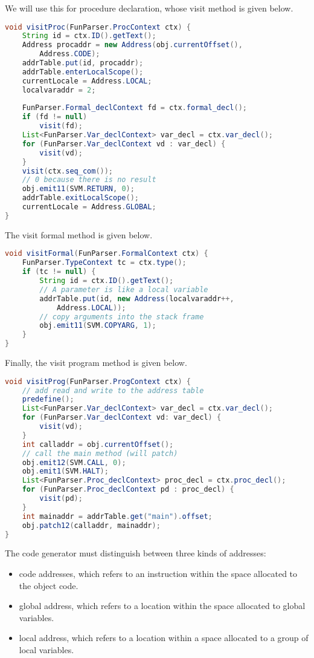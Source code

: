 \documentclass[a4paper, openany]{memoir}
\begin{document}

We will use this for procedure declaration, whose visit method is given below.
\begin{lstlisting}[language=java]
void visitProc(FunParser.ProcContext ctx) {
    String id = ctx.ID().getText();
    Address procaddr = new Address(obj.currentOffset(), 
        Address.CODE);
    addrTable.put(id, procaddr);
    addrTable.enterLocalScope();
    currentLocale = Address.LOCAL;
    localvaraddr = 2;
    
    FunParser.Formal_declContext fd = ctx.formal_decl();
    if (fd != null)
        visit(fd);
    List<FunParser.Var_declContext> var_decl = ctx.var_decl();
    for (FunParser.Var_declContext vd : var_decl) {
        visit(vd);
    }
    visit(ctx.seq_com());
    // 0 because there is no result
    obj.emit11(SVM.RETURN, 0);
    addrTable.exitLocalScope();
    currentLocale = Address.GLOBAL;
}
\end{lstlisting}

The visit formal method is given below.
\begin{lstlisting}[language=java]
void visitFormal(FunParser.FormalContext ctx) {
    FunParser.TypeContext tc = ctx.type();
    if (tc != null) {
        String id = ctx.ID().getText();
        // A parameter is like a local variable
        addrTable.put(id, new Address(localvaraddr++, 
            Address.LOCAL));
        // copy arguments into the stack frame
        obj.emit11(SVM.COPYARG, 1);
    }
}
\end{lstlisting}

Finally, the visit program method is given below.
\begin{lstlisting}[language=java]
void visitProg(FunParser.ProgContext ctx) {
    // add read and write to the address table
    predefine();
    List<FunParser.Var_declContext> var_decl = ctx.var_decl();
    for (FunParser.Var_declContext vd: var_decl) {
        visit(vd);
    }
    int calladdr = obj.currentOffset();
    // call the main method (will patch)
    obj.emit12(SVM.CALL, 0);
    obj.emit1(SVM.HALT);
    List<FunParser.Proc_declContext> proc_decl = ctx.proc_decl();
    for (FunParser.Proc_declContext pd : proc_decl) {
        visit(pd);
    }
    int mainaddr = addrTable.get("main").offset;
    obj.patch12(calladdr, mainaddr);
}
\end{lstlisting}

The code generator must distinguish between three kinds of addresses:
\begin{itemize}
    \item code addresses, which refers to an instruction within the space allocated to the object code.
    \item global address, which refers to a location within the space allocated to global variables.
    \item local address, which refers to a location within a space allocated to a group of local variables.
\end{itemize}
\end{document}

